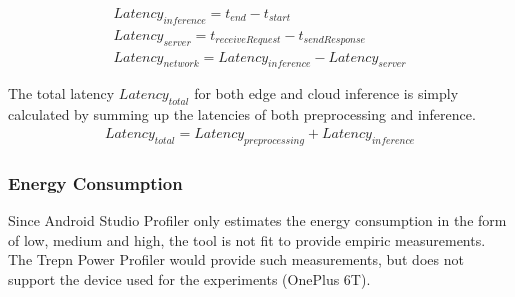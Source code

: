 \begin{equation*}
\begin{gathered}
Latency_{inference} = t_{end} - t_{start}\\
Latency_{server}= t_{receive Request} - t_{send Response}\\
Latency_{network} = Latency_{inference} - Latency_{server}
\end{gathered}
\end{equation*}


The total latency $Latency_{total}$ for both edge and cloud inference is simply calculated by summing up the latencies of both preprocessing and inference.
\begin{equation*}
\begin{gathered}
Latency_{total} = Latency_{preprocessing} + Latency_{inference}
\end{gathered}
\end{equation*}
\subsubsection{Energy Consumption}
Since Android Studio Profiler only estimates the energy consumption in the form of low, medium and high, the tool is not fit to provide empiric measurements. The Trepn Power Profiler would provide such measurements, but does not support the device used for the experiments (OnePlus 6T).
